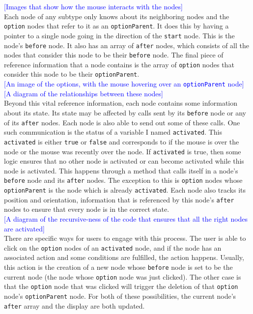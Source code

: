 \documentclass[12pt,twoside]{reedthesis}
\newcommand{\code}[1]{\texttt{#1}}
\begin{document}
	\textcolor{blue}{[Images that show how the mouse interacts with the nodes]}\\
	
	Each node of any subtype only knows about its neighboring nodes and the \code{option} nodes that refer to it as an \code{optionParent}. It does this by having a pointer to a single node going in the direction of the \code{start} node. This is the node's \code{before} node. It also has an array of \code{after} nodes, which consists of all the nodes that consider this node to be their \code{before} node. The final piece of reference information that a node contains is the array of \code{option} nodes that consider this node to be their \code{optionParent}.\\
	
	\textcolor{blue}{[An image of the options, with the mouse hovering over an \code{optionParent} node]}\\
	
	\textcolor{blue}{[A diagram of the relationships between these nodes]}\\
	
	Beyond this vital reference information, each node contains some information about its state. Its state may be affected by calls sent by its \code{before} node or any of its \code{after} nodes. Each node is also able to send out some of these calls. One such communication is the status of a variable I named \code{activated}. This \code{activated} is either \code{true} or \code{false} and corresponds to if the mouse is over the node or the mouse was recently over the node. If \code{activated} is true, then some logic ensures that no other node is activated or can become activated while this node is activated. This happens through a method that calls itself in a node's \code{before} node and its \code{after} nodes. The exception to this is \code{option} nodes whose \code{optionParent} is the node which is already \code{activated}. Each node also tracks its position and orientation, information that is referenced by this node's \code{after} nodes to ensure that every node is in the correct state.\\
	
	\textcolor{blue}{[A diagram of the recursive-ness of the code that ensures that all the right nodes are activated]}\\
	
	There are specific ways for users to engage with this process. The user is able to click on the \code{option} nodes of an \code{activated} node, and if the node has an associated action and some conditions are fulfilled, the action happens. Usually, this action is the creation of a new node whose \code{before} node is set to be the current node (the node whose \code{option} node was just clicked). The other case is that the \code{option} node that was clicked will trigger the deletion of that \code{option} node's \code{optionParent} node. For both of these possibilities, the current node's \code{after} array and the display are both updated.\\
	
\end{document}
